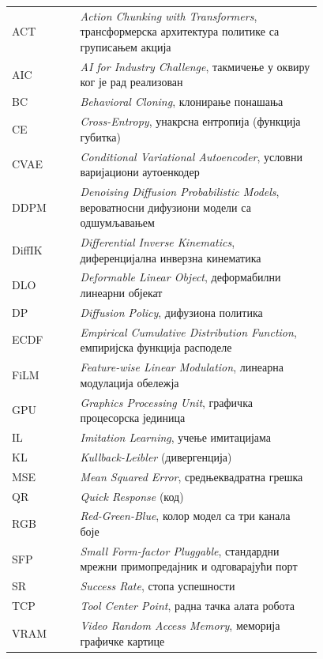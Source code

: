 \documentclass[12pt, a4paper]{article}
\begin{document}
\begin{tabular}{l p{0.78\linewidth}}
    ACT & \textit{Action Chunking with Transformers}, трансформерска архитектура политике са груписањем акција \\[2pt]
    AIC & \textit{AI for Industry Challenge}, такмичење у оквиру ког је рад реализован \\[2pt]
    BC & \textit{Behavioral Cloning}, клонирање понашања \\[2pt]
    CE & \textit{Cross-Entropy}, унакрсна ентропија (функција губитка) \\[2pt]
    CVAE & \textit{Conditional Variational Autoencoder}, условни варијациони аутоенкодер \\[2pt]
    DDPM & \textit{Denoising Diffusion Probabilistic Models}, вероватносни дифузиони модели са одшумљавањем \\[2pt]
    DiffIK & \textit{Differential Inverse Kinematics}, диференцијална инверзна кинематика \\[2pt]
    DLO & \textit{Deformable Linear Object}, деформабилни линеарни објекат \\[2pt]
    DP & \textit{Diffusion Policy}, дифузиона политика \\[2pt]
    ECDF & \textit{Empirical Cumulative Distribution Function}, емпиријска функција расподеле \\[2pt]
    FiLM & \textit{Feature-wise Linear Modulation}, линеарна модулација обележја \\[2pt]
    GPU & \textit{Graphics Processing Unit}, графичка процесорска јединица \\[2pt]
    IL & \textit{Imitation Learning}, учење имитацијама \\[2pt]
    KL & \textit{Kullback-Leibler} (дивергенција) \\[2pt]
    MSE & \textit{Mean Squared Error}, средњеквадратна грешка \\[2pt]
    QR & \textit{Quick Response} (код) \\[2pt]
    RGB & \textit{Red-Green-Blue}, колор модел са три канала боје \\[2pt]
    SFP & \textit{Small Form-factor Pluggable}, стандардни мрежни примопредајник и одговарајући порт \\[2pt]
    SR & \textit{Success Rate}, стопа успешности \\[2pt]
    TCP & \textit{Tool Center Point}, радна тачка алата робота \\[2pt]
    VRAM & \textit{Video Random Access Memory}, меморија графичке картице \\
\end{tabular}
\end{document}

